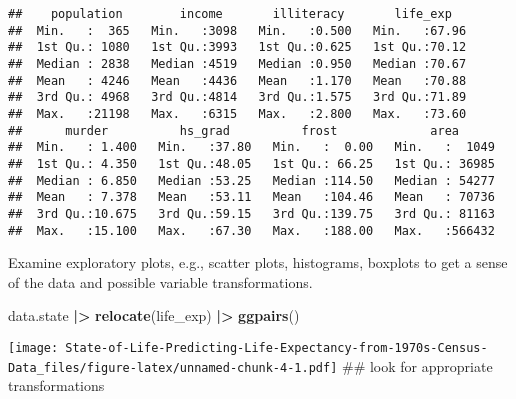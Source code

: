 \documentclass[
]{article}
\newenvironment{Shaded}{\begin{snugshade}}{\end{snugshade}}
\newcommand{\AttributeTok}[1]{\textcolor[rgb]{0.13,0.29,0.53}{#1}}
\newcommand{\FunctionTok}[1]{\textcolor[rgb]{0.13,0.29,0.53}{\textbf{#1}}}
\newcommand{\NormalTok}[1]{#1}
\newcommand{\SpecialCharTok}[1]{\textcolor[rgb]{0.81,0.36,0.00}{\textbf{#1}}}
\newcommand{\StringTok}[1]{\textcolor[rgb]{0.31,0.60,0.02}{#1}}
\begin{document}
\begin{verbatim}
##    population        income       illiteracy       life_exp    
##  Min.   :  365   Min.   :3098   Min.   :0.500   Min.   :67.96  
##  1st Qu.: 1080   1st Qu.:3993   1st Qu.:0.625   1st Qu.:70.12  
##  Median : 2838   Median :4519   Median :0.950   Median :70.67  
##  Mean   : 4246   Mean   :4436   Mean   :1.170   Mean   :70.88  
##  3rd Qu.: 4968   3rd Qu.:4814   3rd Qu.:1.575   3rd Qu.:71.89  
##  Max.   :21198   Max.   :6315   Max.   :2.800   Max.   :73.60  
##      murder          hs_grad          frost             area       
##  Min.   : 1.400   Min.   :37.80   Min.   :  0.00   Min.   :  1049  
##  1st Qu.: 4.350   1st Qu.:48.05   1st Qu.: 66.25   1st Qu.: 36985  
##  Median : 6.850   Median :53.25   Median :114.50   Median : 54277  
##  Mean   : 7.378   Mean   :53.11   Mean   :104.46   Mean   : 70736  
##  3rd Qu.:10.675   3rd Qu.:59.15   3rd Qu.:139.75   3rd Qu.: 81163  
##  Max.   :15.100   Max.   :67.30   Max.   :188.00   Max.   :566432
\end{verbatim}

Examine exploratory plots, e.g., scatter plots, histograms, boxplots to
get a sense of the data and possible variable transformations.

\begin{Shaded}
\begin{Highlighting}[]
\NormalTok{data.state }\SpecialCharTok{|\textgreater{}}
  \FunctionTok{relocate}\NormalTok{(}\StringTok{\textasciigrave{}}\AttributeTok{life\_exp}\StringTok{\textasciigrave{}}\NormalTok{) }\SpecialCharTok{|\textgreater{}}
  \FunctionTok{ggpairs}\NormalTok{()}
\end{Highlighting}
\end{Shaded}

\texttt{[image: State-of-Life-Predicting-Life-Expectancy-from-1970s-Census-Data\_files/figure-latex/unnamed-chunk-4-1.pdf]}
\#\# look for appropriate transformations
\end{document}
